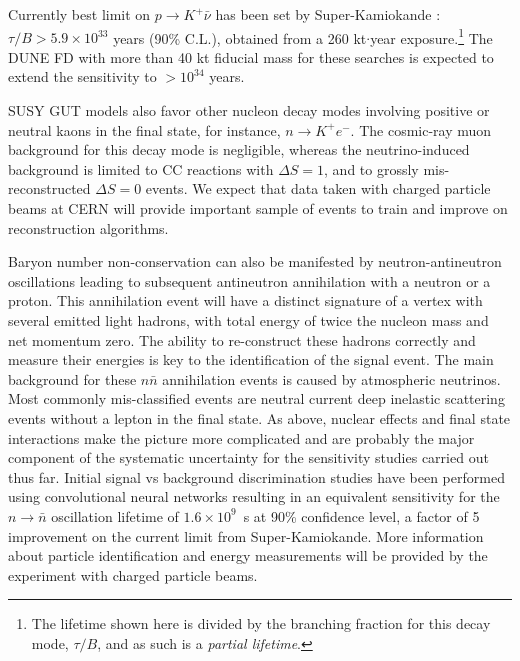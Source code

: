 Currently best limit on $p\to K^+ \bar{\nu}$ has been set by Super-Kamiokande \cite{Abe:2014mwa}: $\tau/B > 5.9\times10^{33}$ years (90\% C.L.), obtained from a 260 kt$\cdot$year exposure.\footnote{The lifetime shown here is divided by the branching fraction for this decay mode, $\tau/B$, and
 as such is a \emph{partial lifetime}.} The DUNE FD with more than 40 kt fiducial mass for these searches is expected to extend the sensitivity to $>10^{34}$ years. 

SUSY GUT models also favor other nucleon decay modes involving positive or neutral kaons in the final state, for instance, $n\to K^+ e^-$. The cosmic-ray muon background for this decay mode is negligible, whereas the neutrino-induced background is limited to CC reactions with $\Delta S = 1$, and to grossly mis-reconstructed $\Delta S = 0$ events. 
We expect that  data taken with charged particle beams at CERN will provide important sample of events to train and improve on reconstruction algorithms. 


Baryon number non-conservation can also be manifested by neutron-antineutron oscillations leading to subsequent antineutron annihilation with a neutron or a proton. This annihilation event will have a distinct signature of a vertex with several emitted light hadrons, with total energy of twice the nucleon mass and net momentum zero. The ability to re-construct these hadrons correctly and measure their energies is key to the identification of the signal event. The main background for these $n\bar n$ annihilation events is caused by atmospheric neutrinos. Most commonly mis-classified events are neutral current deep inelastic scattering events without a lepton in the final state. As above, nuclear effects and final state interactions make the picture more complicated and are probably the major component of the systematic uncertainty for the sensitivity studies carried out thus far.  Initial signal vs background discrimination studies have been performed using convolutional neural networks resulting in an equivalent sensitivity for the $n\rightarrow \bar n$ oscillation lifetime of $1.6 \times 10^9$~s at 90\% confidence level, a factor of 5 improvement on the current limit from Super-Kamiokande.
More information about particle identification and energy measurements will be provided by the  experiment with charged particle beams. 

